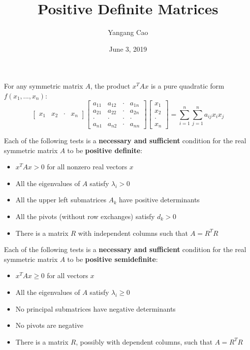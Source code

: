 \documentclass[10pt,a4paper,oneside]{article}
\author{Yangang Cao}
\date{June 3, 2019}
\begin{document}
\title{Positive Definite Matrices}
\maketitle 
For any symmetric matrix $A$, the product $x^TAx$ is a pure quadratic form $f(x_1,...,x_n)$:
$$
\left[\begin{array}{llll}{x_{1}} & {x_{2}} & {\cdot} & {x_{n}}\end{array}\right]\left[\begin{array}{cccc}{a_{11}} & {a_{12}} & {\cdot} & {a_{1 n}} \\ {a_{21}} & {a_{22}} & {\cdot} & {a_{2 n}} \\ {\cdot} & {\cdot} & {\cdot} & {\cdot} \\ {a_{n 1}} & {a_{n 2}} & {\cdot} & {a_{n n}}\end{array}\right]\left[\begin{array}{c}{x_{1}} \\ {x_{2}} \\ {\cdot} \\ {x_{n}}\end{array}\right]=\sum_{i=1}^{n} \sum_{j=1}^{n} a_{i j} x_{i} x_{j}
$$

Each of the following tests is a {\bfseries necessary and sufficient} condition for the real symmetric matrix $A$ to be {\bfseries positive definite}:
\begin{itemize}
\item $x^TAx > 0$ for all nonzero real vectors $x$
\item All the eigenvalues of $A$ satisfy $\lambda_i>0$
\item All the upper left submatrices $A_k$ have positive determinants
\item All the pivots (without row exchanges) satisfy $d_k>0$
\item There is a matrix $R$ with independent columns such that $A=R^TR$ 
\end{itemize}

Each of the following tests is a {\bfseries necessary and sufficient} condition for the real symmetric matrix $A$ to be {\bfseries positive semidefinite}:
\begin{itemize}
\item $x^TAx\geqslant 0$ for all vectors $x$
\item All the eigenvalues of $A$ satisfy $\lambda_i\geqslant0$
\item No principal submatrices have negative determinants
\item No pivots are negative
\item There is a matrix $R$, possibly with dependent columns, such that $A=R^TR$
\end{itemize}
\end{document}
